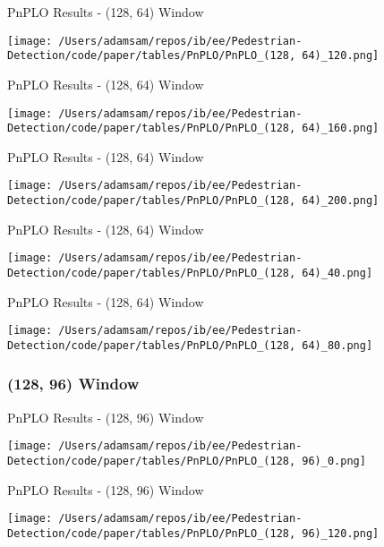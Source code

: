 \begin{table}
    \caption{PnPLO Results - (128, 64) Window}
    \texttt{[image: /Users/adamsam/repos/ib/ee/Pedestrian-Detection/code/paper/tables/PnPLO/PnPLO\_(128, 64)\_120.png]}
    \label{tab:PnPLO_(128, 64)_120}
\end{table}

\begin{table}
    \caption{PnPLO Results - (128, 64) Window}
    \texttt{[image: /Users/adamsam/repos/ib/ee/Pedestrian-Detection/code/paper/tables/PnPLO/PnPLO\_(128, 64)\_160.png]}
    \label{tab:PnPLO_(128, 64)_160}
\end{table}

\begin{table}
    \caption{PnPLO Results - (128, 64) Window}
    \texttt{[image: /Users/adamsam/repos/ib/ee/Pedestrian-Detection/code/paper/tables/PnPLO/PnPLO\_(128, 64)\_200.png]}
    \label{tab:PnPLO_(128, 64)_200}
\end{table}

\begin{table}
    \caption{PnPLO Results - (128, 64) Window}
    \texttt{[image: /Users/adamsam/repos/ib/ee/Pedestrian-Detection/code/paper/tables/PnPLO/PnPLO\_(128, 64)\_40.png]}
    \label{tab:PnPLO_(128, 64)_40}
\end{table}

\begin{table}
    \caption{PnPLO Results - (128, 64) Window}
    \texttt{[image: /Users/adamsam/repos/ib/ee/Pedestrian-Detection/code/paper/tables/PnPLO/PnPLO\_(128, 64)\_80.png]}
    \label{tab:PnPLO_(128, 64)_80}
\end{table}

\subsubsection*{(128, 96) Window}

\begin{table}
    \caption{PnPLO Results - (128, 96) Window}
    \texttt{[image: /Users/adamsam/repos/ib/ee/Pedestrian-Detection/code/paper/tables/PnPLO/PnPLO\_(128, 96)\_0.png]}
    \label{tab:PnPLO_(128, 96)_0}
\end{table}

\begin{table}
    \caption{PnPLO Results - (128, 96) Window}
    \texttt{[image: /Users/adamsam/repos/ib/ee/Pedestrian-Detection/code/paper/tables/PnPLO/PnPLO\_(128, 96)\_120.png]}
    \label{tab:PnPLO_(128, 96)_120}
\end{table}

